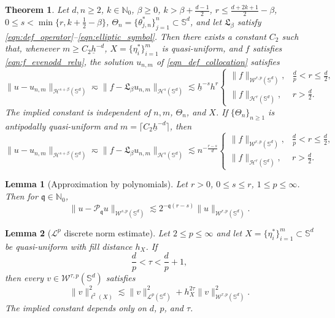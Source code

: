 \documentclass[10pt,a4paper]{amsart}
\newtheorem{theorem}{Theorem}
\newtheorem{lemma}{Lemma}
\def\NN{\mathbb{N}}
\def\SS{\mathbb{S}}
\def\mP{\mathcal{P}}
\def\mq{\mathfrak{q}}
\begin{document}
\begin{theorem}\label{thm:leastsquare}
Let $d,n\geq2$, $k\in\NN_0$, $\beta\geq0$, $k> \beta+\frac{d-1}{2}$, $r\leq\frac{d+2k+1}{2}-\beta$, $0\leq s<\min\{r,k+\frac{1}{2}-\beta\}$, $\Theta_n=\{\theta_{j,n}^*\}_{j=1}^n\subset\SS^d$, and let $\mathfrak L_\beta$ satisfy \eqref{eqn:def_operator}--\eqref{eqn:elliptic_symbol}. Then there exists a constant $C_2$ such that, whenever $m\geq C_2\underline h^{-d}$, $X=\{\eta_i^*\}_{i=1}^m$ is quasi-uniform, and $f$ satisfies \eqref{eqn:f_evenodd_relu}, the solution $u_{n,m}$ of \eqref{eqn_def_collocation} satisfies
\begin{equation}\label{eqn_main_ls_determ}
\|u-u_{n,m}\|_{\mathcal H^{s+\beta}(\SS^d)}\eqsim\|f-\mathfrak L_\beta u_{n,m}\|_{\mathcal H^s(\SS^d)}\lesssim\underline h^{-s}h^r
\begin{cases}
\|f\|_{\mathcal W^{r,p}(\SS^d)},&\frac dp<r\leq \frac{d}{2},\\
\|f\|_{\mathcal H^r(\SS^d)},&r>\frac{d}{2}.
\end{cases}
\end{equation}
The implied constant is independent of $n,m$, $\Theta_n$, and $X$. If $\{\Theta_n\}_{n\geq1}$ is antipodally quasi-uniform and $m=\lceil C_2\underline h^{-d}\rceil$, then
\begin{equation}
\|u-u_{n,m}\|_{\mathcal H^{s+\beta}(\SS^d)}\eqsim\|f-\mathfrak L_\beta u_{n,m}\|_{\mathcal H^s(\SS^d)}\lesssim n^{-\frac{r-s}{d}}
\begin{cases}
\|f\|_{\mathcal W^{r,p}(\SS^d)},&\frac dp<r\leq \frac{d}{2},\\
\|f\|_{\mathcal H^r(\SS^d)},&r>\frac{d}{2}.
\end{cases}
\end{equation}
\end{theorem}

\begin{lemma}[Approximation by polynomials]\label{lem_sharp_appr_poly}
    Let $r>0$, $0\leq s\leq r$, $1\leq p\leq\infty$. Then for $\mq\in\NN_0$,
    \begin{equation}\label{eqn_sharp_appr_poly}
        \|u-\mP_\mq u\|_{\mathcal W^{s,p}(\SS^d)}\lesssim2^{-\mq (r-s)}\|u\|_{\mathcal{W}^{r,p}(\SS^d)}.
    \end{equation}
\end{lemma}

\begin{lemma}[$\mathcal L^p$ discrete norm estimate]\label{lem_discrete_by_cont}
Let $2\leq p\leq\infty$ and let $X=\{\eta_i^*\}_{i=1}^m\subset\SS^d$ be quasi-uniform with fill distance $h_X$. If
\begin{equation*}
    \frac dp<\tau<\frac dp+1,
\end{equation*}
then every $v\in\mathcal W^{\tau,p}(\SS^d)$ satisfies
\begin{equation}\label{eqn:norming}
    \|v\|_{\ell^2(X)}^2\lesssim\|v\|_{\mathcal L^p(\SS^d)}^2+h_X^{2\tau}\|v\|_{\mathcal W^{\tau,p}(\SS^d)}^2.
\end{equation}
The implied constant depends only on $d$, $p$, and $\tau$.
\end{lemma}
\end{document}
